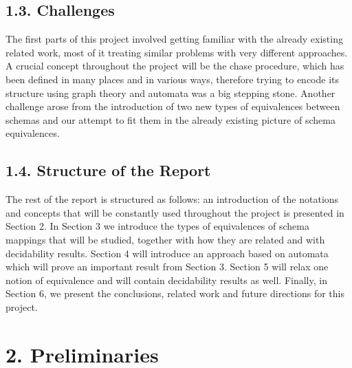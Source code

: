 \documentclass[11pt, a4paper, dvipsnames]{article}
\begin{document}
\subsection{1.3. Challenges}
The first parts of this project involved getting familiar with the already existing related work, most of it treating similar problems with very different approaches. A crucial concept throughout the project will be the chase procedure, which has been defined in many places and in various ways, therefore trying to encode its structure using graph theory and automata was a big stepping stone. Another challenge arose from the introduction of two new types of equivalences between schemas and our attempt to fit them in the already existing picture of schema equivalences.

\subsection{1.4. Structure of the Report}
The rest of the report is structured as follows: an introduction of the notations and concepts that will be constantly used throughout the project is presented in Section 2.  In Section 3 we introduce the types of equivalences of schema mappings that will be studied, together with how they are related and with decidability results. Section 4 will introduce an approach based on automata which will prove an important result from Section 3. Section 5 will relax one notion of equivalence and will contain decidability results as well. Finally, in Section 6, we present the conclusions, related work and future directions for this project. 

\newpage

\section{2. Preliminaries}
\end{document}
